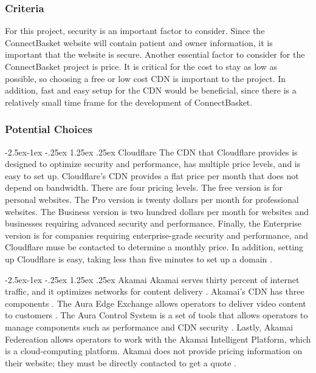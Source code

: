 \documentclass[onecolumn, draftclsnofoot,10pt, compsoc]{IEEEtran}
\makeatletter
\renewcommand\paragraph{\@startsection{paragraph}{4}{\z@}%
            {-2.5ex\@plus -1ex \@minus -.25ex}%
            {1.25ex \@plus .25ex}%
            {\normalfont\normalsize\bfseries}}
\makeatother
\begin{document}
\subsubsection{Criteria}
For this project, security is an important factor to consider. Since the ConnectBasket website will contain patient and owner information, it is important that the website is secure. Another essential factor to consider for the ConnectBasket project is price. It is critical for the cost to stay as low as possible, so choosing a free or low cost CDN is important to the project. In addition, fast and easy setup for the CDN would be beneficial, since there is a relatively small time frame for the development of ConnectBasket.


\subsubsection{Potential Choices}

\paragraph{Cloudflare}
The CDN that Cloudflare provides is designed to optimize security and performance, has multiple price levels, and is easy to set up. Cloudflare's CDN provides a flat price per month that does not depend on bandwidth. There are four pricing levels. The free version is for personal websites. The Pro version is twenty dollars per month for professional websites. The Business version is two hundred dollars per month for websites and businesses requiring advanced security and performance. Finally, the Enterprise version is for companies requiring enterprise-grade security and performance, and Cloudflare muse be contacted to determine a monthly price. In addition, setting up Cloudflare is easy, taking less than five minutes to set up a domain \cite{cloudflare}.

\paragraph{Akamai}
Akamai serves thirty percent of internet traffic, and it optimizes networks for content delivery \cite{akamaicdn}. Akamai's CDN has three components \cite{akamaicdn}. The Aura Edge Exchange allows operators to deliver video content to customers \cite{akamaicdn}. The Aura Control System is a set of tools that allows operators to manage components such as performance and CDN security \cite{akamaicdn}. Lastly, Akamai Federeation allows operators to work with the Akamai Intelligent Platform, which is a cloud-computing platform. Akamai does not provide pricing information on their website; they must be directly contacted to get a quote \cite{akamaicdn}.  
\end{document}
